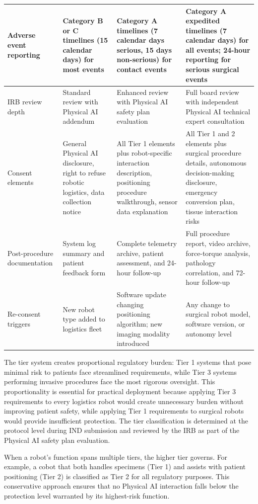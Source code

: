 \begin{table}[H]
\begin{tabularx}{\textwidth}{>{\raggedright\arraybackslash}p{2cm} >{\raggedright\arraybackslash}X >{\raggedright\arraybackslash}X >{\raggedright\arraybackslash}X}
\midrule
Adverse event reporting & Category B or C timelines (15 calendar days) for most events & Category A timelines (7 calendar days serious, 15 days non-serious) for contact events & Category A expedited timelines (7 calendar days) for all events; 24-hour reporting for serious surgical events \\
\midrule
IRB review depth & Standard review with Physical AI addendum & Enhanced review with Physical AI safety plan evaluation & Full board review with independent Physical AI technical expert consultation \\
\midrule
Consent elements & General Physical AI disclosure, right to refuse robotic logistics, data collection notice & All Tier 1 elements plus robot-specific interaction description, positioning procedure walkthrough, sensor data explanation & All Tier 1 and 2 elements plus surgical procedure details, autonomous decision-making disclosure, emergency conversion plan, tissue interaction risks \\
\midrule
Post-procedure documentation & System log summary and patient feedback form & Complete telemetry archive, patient assessment, and 24-hour follow-up & Full procedure report, video archive, force-torque analysis, pathology correlation, and 72-hour follow-up \\
\midrule
Re-consent triggers & New robot type added to logistics fleet & Software update changing positioning algorithm; new imaging modality introduced & Any change to surgical robot model, software version, or autonomy level \\
\bottomrule
\end{tabularx}
\end{table}

The tier system creates proportional regulatory burden: Tier 1 systems that
pose minimal risk to patients face streamlined requirements, while Tier 3
systems performing invasive procedures face the most rigorous oversight. This
proportionality is essential for practical deployment because applying Tier 3
requirements to every logistics robot would create unnecessary burden without
improving patient safety, while applying Tier 1 requirements to surgical robots
would provide insufficient protection. The tier classification is determined at
the protocol level during IND submission and reviewed by the IRB as part of the
Physical AI safety plan evaluation.

When a robot's function spans multiple tiers, the higher tier governs. For
example, a cobot that both handles specimens (Tier 1) and assists with patient
positioning (Tier 2) is classified as Tier 2 for all regulatory purposes. This
conservative approach ensures that no Physical AI interaction falls below the
protection level warranted by its highest-risk function.

